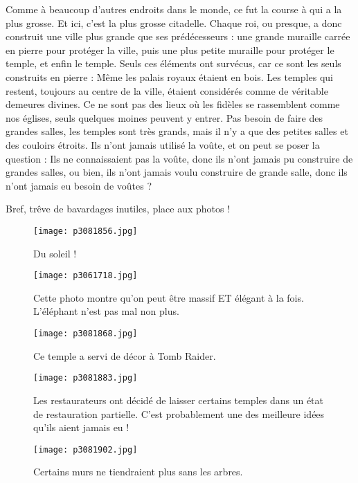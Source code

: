 \documentclass{book}
\begin{document}
Comme à beaucoup d'autres endroits dans le monde, ce fut la course à qui a la plus grosse. Et ici, c'est la plus grosse citadelle. Chaque roi, ou presque, a donc construit une ville plus grande que ses prédécesseurs : une grande muraille carrée en pierre pour protéger la ville, puis une plus petite muraille pour protéger le temple, et enfin le temple. Seuls ces éléments ont survécus, car ce sont les seuls construits en pierre : Même les palais royaux étaient en bois. Les temples qui restent, toujours au centre de la ville, étaient considérés comme de véritable demeures divines. Ce ne sont pas des lieux où les fidèles se rassemblent comme nos églises, seuls quelques moines peuvent y entrer. Pas besoin de faire des grandes salles, les temples sont très grands, mais il n'y a que des petites salles et des couloirs étroits. Ils n'ont jamais utilisé la voûte, et on peut se poser la question : Ils ne connaissaient pas la voûte, donc ils n'ont jamais pu construire de grandes salles, ou bien, ils n'ont jamais voulu construire de grande salle, donc ils n'ont jamais eu besoin de voûtes ?

Bref, trêve de bavardages inutiles, place aux photos !


\begin{figure}[h]
\centering
\texttt{[image: p3081856.jpg]}
\caption*{Du soleil !}
\end{figure}


\begin{figure}[h]
\centering
\texttt{[image: p3061718.jpg]}
\caption*{Cette photo montre qu'on peut être massif ET élégant à la fois. L'éléphant n'est pas mal non plus.}
\end{figure}


\begin{figure}[h]
\centering
\texttt{[image: p3081868.jpg]}
\caption*{Ce temple a servi de décor à Tomb Raider.}
\end{figure}


\begin{figure}[h]
\centering
\texttt{[image: p3081883.jpg]}
\caption*{Les restaurateurs ont décidé de laisser certains temples dans un état de restauration partielle. C'est probablement une des meilleure idées qu'ils aient jamais eu !}
\end{figure}


\begin{figure}[h]
\centering
\texttt{[image: p3081902.jpg]}
\caption*{Certains murs ne tiendraient plus sans les arbres.}
\end{figure}
\end{document}
